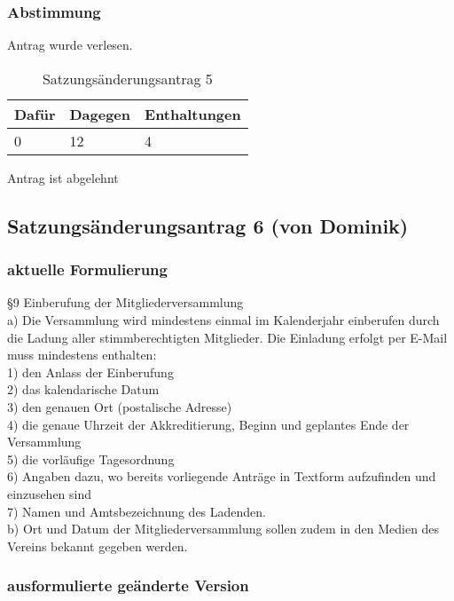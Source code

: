 \documentclass[a4paper]{scrartcl}
\begin{document}
\subsubsection{Abstimmung}

Antrag wurde verlesen.

\begin{table}[h]
	\begin{tabularx}{\textwidth}{XXX}
		Dafür & Dagegen & Enthaltungen\\
		\toprule
		0 & 12 & 4\\
	\end{tabularx}
	\caption{Satzungsänderungsantrag 5}
\end{table}
 Antrag ist abgelehnt
    
\subsection{Satzungsänderungsantrag 6 (von Dominik)}
\subsubsection{aktuelle Formulierung}

§9 Einberufung der Mitgliederversammlung\\
a) Die Versammlung wird mindestens einmal im Kalenderjahr einberufen durch die Ladung aller stimmberechtigten Mitglieder. Die Einladung erfolgt per E-Mail muss mindestens enthalten:\\
1) den Anlass der Einberufung\\
2) das kalendarische Datum\\
3) den genauen Ort (postalische Adresse)\\
4) die genaue Uhrzeit der Akkreditierung, Beginn und geplantes Ende der Versammlung\\
5) die vorläufige Tagesordnung\\
6) Angaben dazu, wo bereits vorliegende Anträge in Textform aufzufinden und einzusehen sind\\
7) Namen und Amtsbezeichnung des Ladenden.\\
b) Ort und Datum der Mitgliederversammlung sollen zudem in den Medien des Vereins bekannt gegeben werden.\\


\subsubsection{ausformulierte geänderte Version}
\end{document}
